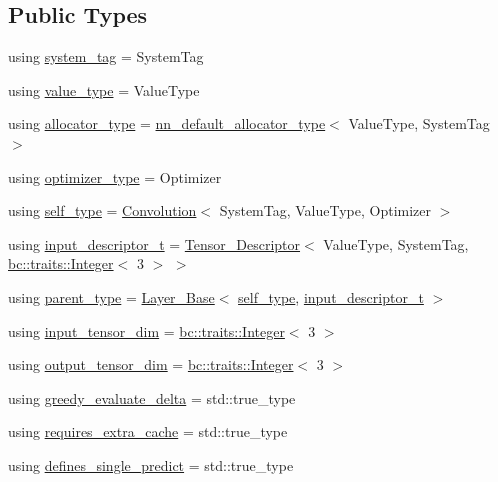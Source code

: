 \subsection*{Public Types}
\begin{DoxyCompactItemize}
\item 
using \hyperlink{structbc_1_1nn_1_1Convolution_aa4228d722aee390c2288f87ff676ee63}{system\+\_\+tag} = System\+Tag
\item 
using \hyperlink{structbc_1_1nn_1_1Convolution_ad57a7bb1413ba889d475bfafac3c8461}{value\+\_\+type} = Value\+Type
\item 
using \hyperlink{structbc_1_1nn_1_1Convolution_a5d5ef8c34e8495442aafdb752ae0b8b5}{allocator\+\_\+type} = \hyperlink{namespacebc_1_1nn_a0025752fc3f47f988b3fae106c825860}{nn\+\_\+default\+\_\+allocator\+\_\+type}$<$ Value\+Type, System\+Tag $>$
\item 
using \hyperlink{structbc_1_1nn_1_1Convolution_a32c8282bec07115a029de6a8c6a34edf}{optimizer\+\_\+type} = Optimizer
\item 
using \hyperlink{structbc_1_1nn_1_1Convolution_a53ebb74b7fab047c1ad45a1f03fc8dd9}{self\+\_\+type} = \hyperlink{structbc_1_1nn_1_1Convolution}{Convolution}$<$ System\+Tag, Value\+Type, Optimizer $>$
\item 
using \hyperlink{structbc_1_1nn_1_1Convolution_a01dcd0bf8ae2c1d94118a4f410b3e568}{input\+\_\+descriptor\+\_\+t} = \hyperlink{structbc_1_1nn_1_1Tensor__Descriptor}{Tensor\+\_\+\+Descriptor}$<$ Value\+Type, System\+Tag, \hyperlink{structbc_1_1traits_1_1Integer}{bc\+::traits\+::\+Integer}$<$ 3 $>$ $>$
\item 
using \hyperlink{structbc_1_1nn_1_1Convolution_a3a308c5508fc0aafdac299e87e87206c}{parent\+\_\+type} = \hyperlink{structbc_1_1nn_1_1Layer__Base}{Layer\+\_\+\+Base}$<$ \hyperlink{structbc_1_1nn_1_1Convolution_a53ebb74b7fab047c1ad45a1f03fc8dd9}{self\+\_\+type}, \hyperlink{structbc_1_1nn_1_1Convolution_a01dcd0bf8ae2c1d94118a4f410b3e568}{input\+\_\+descriptor\+\_\+t} $>$
\item 
using \hyperlink{structbc_1_1nn_1_1Convolution_a4b9d52a3c24e2e44ae51e0e06819bf45}{input\+\_\+tensor\+\_\+dim} = \hyperlink{structbc_1_1traits_1_1Integer}{bc\+::traits\+::\+Integer}$<$ 3 $>$
\item 
using \hyperlink{structbc_1_1nn_1_1Convolution_a20d103087eb0fa4c47e9640eae02e401}{output\+\_\+tensor\+\_\+dim} = \hyperlink{structbc_1_1traits_1_1Integer}{bc\+::traits\+::\+Integer}$<$ 3 $>$
\item 
using \hyperlink{structbc_1_1nn_1_1Convolution_a5e9292df10095f5c69ef52837f523290}{greedy\+\_\+evaluate\+\_\+delta} = std\+::true\+\_\+type
\item 
using \hyperlink{structbc_1_1nn_1_1Convolution_a084b2b7a45329f1a70aab1a9333829a6}{requires\+\_\+extra\+\_\+cache} = std\+::true\+\_\+type
\item 
using \hyperlink{structbc_1_1nn_1_1Convolution_a10d2913efe2df593fd0491fc1cc39dc6}{defines\+\_\+single\+\_\+predict} = std\+::true\+\_\+type
\end{DoxyCompactItemize}

